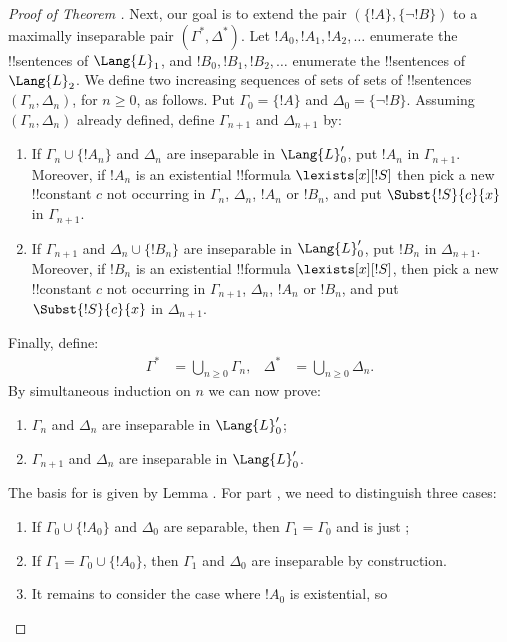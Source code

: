 \documentclass[../../include/open-logic-section]{subfiles}
\begin{document}
\begin{proof}[Proof of Theorem ]
Next, our goal is to extend the pair $(\{ !A \}, \{\lnot!B\})$ to a
maximally inseparable pair $(\Gamma^*, \Delta^*)$.  Let $!A_0, !A_1,
!A_2, \dots$ enumerate the !!{sentence}s of $\Lang{L}_1$, and $!B_0,
!B_1, !B_2, \dots$ enumerate the !!{sentence}s of $\Lang{L}_2$. We
define two increasing sequences of sets of sets of !!{sentence}s
$(\Gamma_n, \Delta_n)$, for $n \ge 0$, as follows. Put $\Gamma_0 = \{
!A\}$ and $\Delta_0 = \{\lnot !B \}$. Assuming $(\Gamma_n, \Delta_n)$
already defined, define $\Gamma_{n+1}$ and $\Delta_{n+1}$ by:
\begin{enumerate}
\item If $\Gamma_n \cup \{!A_n \}$ and $\Delta_n$ are inseparable in
  $\Lang{L}'_0$, put $!A_n$ in $\Gamma_{n+1}$. Moreover, if $!A_n$ is
  an existential !!{formula} $\lexists[x][!S]$ then pick a new
  !!{constant} $c$ not occurring in $\Gamma_n$, $\Delta_n$, $!A_n$ or
  $!B_n$, and put $\Subst{!S}{c}{x}$ in $\Gamma_{n+1}$.
\item If $\Gamma_{n+1}$ and $\Delta_n \cup \{!B_n \}$ are inseparable
  in $\Lang{L}'_0$, put $!B_n$ in $\Delta_{n+1}$. Moreover, if $!B_n$
  is an existential !!{formula} $\lexists[x][!S]$, then pick a new
  !!{constant} $c$ not occurring in $\Gamma_{n+1}$, $\Delta_n$, $!A_n$
  or $!B_n$, and put $\Subst{!S}{c}{x}$ in $\Delta_{n+1}$.
\end{enumerate}
Finally, define:
\begin{align*}
  \Gamma^* & = \bigcup_{n\ge 0} \Gamma_n, & 
  \Delta^* & = \bigcup_{n\ge 0} \Delta_n.
\end{align*}
By simultaneous induction on $n$ we can now prove:
\begin{enumerate}
\item{} $\Gamma_n$ and $\Delta_n$ are inseparable in
  $\Lang{L}'_0$;
\item{} $\Gamma_{n+1}$ and $\Delta_n$ are inseparable in
    $\Lang{L}'_0$.
\end{enumerate}
The basis for  is given by Lemma . For
part , we need to distinguish three cases:
\begin{enumerate}
\item If $\Gamma_0 \cup \{!A_0 \}$ and $\Delta_0$ are separable, then
  $\Gamma_1 = \Gamma_0$ and  is just ;
\item If $\Gamma_1 = \Gamma_0 \cup\{ !A_0\}$, then $\Gamma_1$ and
  $\Delta_0$ are inseparable by construction.
\item It remains to consider the case where $!A_0$ is existential, so

\end{enumerate}
\end{proof}
\end{document}
